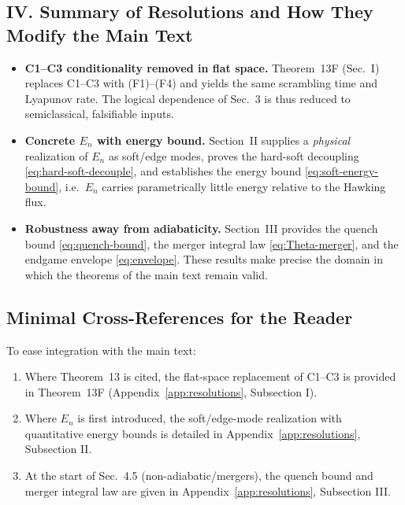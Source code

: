 \subsection*{IV. Summary of Resolutions and How They Modify the Main Text}
\begin{itemize}
  \item \textbf{C1--C3 conditionality removed in flat space.} Theorem~13F (Sec.~I) replaces C1--C3 with (F1)--(F4) and yields the same scrambling time and Lyapunov rate. The logical dependence of Sec.~3 is thus reduced to semiclassical, falsifiable inputs.
  \item \textbf{Concrete $E_n$ with energy bound.} Section~II supplies a \emph{physical} realization of $E_n$ as soft/edge modes, proves the hard-soft decoupling \eqref{eq:hard-soft-decouple}, and establishes the energy bound \eqref{eq:soft-energy-bound}, i.e.~$E_n$ carries parametrically little energy relative to the Hawking flux.
  \item \textbf{Robustness away from adiabaticity.} Section~III provides the quench bound \eqref{eq:quench-bound}, the merger integral law \eqref{eq:Theta-merger}, and the endgame envelope \eqref{eq:envelope}. These results make precise the domain in which the theorems of the main text remain valid.
\end{itemize}

\bigskip
\subsection{Minimal Cross-References for the Reader}
\noindent
To ease integration with the main text:
\begin{enumerate}
  \item Where Theorem~13 is cited, the flat-space replacement of C1--C3 is provided in Theorem~13F (Appendix~\ref{app:resolutions}, Subsection I).
  \item Where $E_n$ is first introduced, the soft/edge-mode realization with quantitative energy bounds is detailed in Appendix~\ref{app:resolutions}, Subsection II.
  \item At the start of Sec.~4.5 (non-adiabatic/mergers), the quench bound and merger integral law are given in Appendix~\ref{app:resolutions}, Subsection III.
\end{enumerate}
